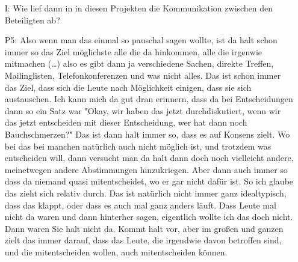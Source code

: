 \begin{itemize}
    \item[I:] Wie lief dann in in diesen Projekten die Kommunikation zwischen den Beteiligten ab?
    \item[P5:] Also wenn man das einmal so pauschal sagen wollte, ist da halt schon immer so das Ziel m{\"o}glichste alle die da hinkommen, alle die irgenwie mitmachen (\dots) also es gibt dann ja verschiedene Sachen, direkte Treffen, Mailinglisten, Telefonkonferenzen und was nicht alles. Das ist schon immer das Ziel, dass sich die Leute nach M{\"o}glichkeit einigen, dass sie sich austauschen. Ich kann mich da gut dran erinnern, dass da bei Entscheidungen dann so ein Satz war "Okay, wir haben das jetzt durchdiskutiert, wenn wir das jetzt entscheiden mit dieser Entscheidung, wer hat dann noch Bauchschmerzen?" Das ist dann halt immer so, dass es auf Konsens zielt. Wo bei das bei manchen nat{\"u}rlich auch nicht m{\"o}glich ist, und trotzdem was entscheiden will, dann versucht man da halt dann doch noch vielleicht andere, meinetwegen andere Abstimmungen hinzukriegen. Aber dann auch immer so dass da niemand quasi mitentscheidet, wo er gar nicht daf{\"u}r ist. So ich glaube das zieht sich relativ durch. Das ist nat{\"u}rlich nicht immer ganz idealtypisch, dass das klappt, oder dass es auch mal ganz anders l{\"a}uft. Dass Leute mal nicht da waren und dann hinterher sagen, eigentlich wollte ich das doch nicht. Dann waren Sie halt nicht da. Kommt halt vor, aber im gro{\ss}en und ganzen zielt das immer darauf, dass das Leute, die irgendwie davon betroffen sind, und die mitentscheiden wollen, auch mitentscheiden k{\"o}nnen. 
\end{itemize}

